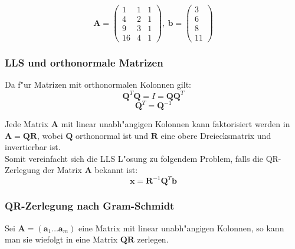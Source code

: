 \documentclass[german, 10pt, a4paper, twocolumn]{scrartcl}
\begin{document}
\begin{displaymath}
\mathbf{A}=
\left (
\begin{array}{ccc}
 1 & 1 & 1\\
 4 & 2 & 1\\
 9 & 3 & 1\\
 16 & 4 & 1
\end{array}
\right ),\: \mathbf{b}=
\left (
\begin{array}{c}
 3 \\
 6 \\
 8 \\
 11 
\end{array}
\right )
\end{displaymath}

\subsubsection{LLS und orthonormale Matrizen}


Da f"ur Matrizen mit orthonormalen Kolonnen gilt:
\begin{displaymath}\mathbf{Q}^T\mathbf{Q}=I=\mathbf{Q}\mathbf{Q}^T\end{displaymath}
\begin{displaymath}\mathbf{Q}^T=\mathbf{Q}^{-1}\end{displaymath}

Jede Matrix $\mathbf{A}$ mit linear unabh"angigen Kolonnen kann faktorisiert werden in $\mathbf{A}=\mathbf{QR}$, wobei $\mathbf{Q}$ orthonormal ist und $\mathbf{R}$ eine obere Dreiecksmatrix und invertierbar ist.\\

Somit vereinfacht sich die LLS L"osung zu folgendem Problem, falls die QR-Zerlegung der Matrix $\mathbf{A}$ bekannt ist:
\begin{displaymath}\mathbf{x}=\mathbf{R}^{-1}\mathbf{Q}^T\mathbf{b}\end{displaymath}

\subsubsection{QR-Zerlegung nach Gram-Schmidt}


Sei $\mathbf{A}=(\mathbf{a}_1 \ldots \mathbf{a}_m)$ eine Matrix mit linear unabh"angigen Kolonnen, so kann man sie wiefolgt in eine Matrix $\mathbf{QR}$ zerlegen.\\
\end{document}
